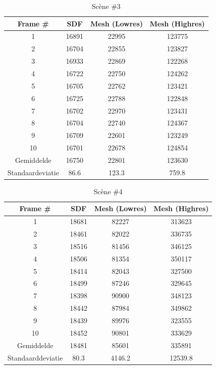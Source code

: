 \documentclass[12pt, a4paper]{article}
\begin{document}
\begin{table}[H]
\centering
\begin{tabular}{| c | c c c |}
	\hline
	Frame \# & SDF & Mesh (Lowres) & Mesh (Highres) \\
	\hline
	1 &16891 &22995 &123775 \\
	2 &16704 &22855 &123827 \\
	3 &16933 &22869 &122268 \\
	4 &16722 &22750 &124262 \\
	5 &16705 &22762 &123421 \\
	6 &16725 &22788 &122848 \\
	7 &16702 &22970 &123431 \\
	8 &16704 &22740 &124367 \\
	9 &16709 &22601 &123249 \\
	10 &16701 &22678 &124854 \\
	\hline
	Gemiddelde &16750 &22801 &123630 \\
	Standaardeviatie &86.6 &123.3 &759.8 \\
	\hline
\end{tabular}
\caption{Scène \#3}
\end{table}
\begin{table}[H]
\centering
\begin{tabular}{| c | c c c |}
	\hline
	Frame \# & SDF & Mesh (Lowres) & Mesh (Highres) \\
	\hline
	1 &18681 &82227 &313623 \\
	2 &18461 &82022 &336735 \\
	3 &18516 &81456 &346125 \\
	4 &18506 &81354 &350117 \\
	5 &18414 &82043 &327500 \\
	6 &18499 &87246 &329645 \\
	7 &18398 &90900 &348123 \\
	8 &18442 &87984 &349862 \\
	9 &18439 &89976 &323555 \\
	10 &18452 &90801 &333629 \\
	\hline
	Gemiddelde &18481 &85601 &335891 \\
	Standaarddeviatie &80.3 &4146.2 &12539.8 \\
	\hline
\end{tabular}
\caption{Scène \#4}
\end{table}
\end{document}
